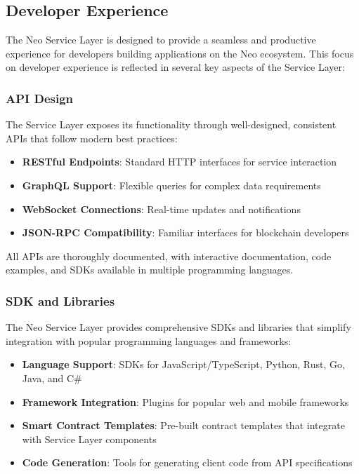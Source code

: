 \subsection{Developer Experience}
\label{subsec:nsl-developer}

The Neo Service Layer is designed to provide a seamless and productive experience for developers building applications on the Neo ecosystem. This focus on developer experience is reflected in several key aspects of the Service Layer:

\subsubsection{API Design}
\label{subsubsec:api-design}

The Service Layer exposes its functionality through well-designed, consistent APIs that follow modern best practices:

\begin{itemize}
    \item \textbf{RESTful Endpoints}: Standard HTTP interfaces for service interaction
    \item \textbf{GraphQL Support}: Flexible queries for complex data requirements
    \item \textbf{WebSocket Connections}: Real-time updates and notifications
    \item \textbf{JSON-RPC Compatibility}: Familiar interfaces for blockchain developers
\end{itemize}

All APIs are thoroughly documented, with interactive documentation, code examples, and SDKs available in multiple programming languages.

\subsubsection{SDK and Libraries}
\label{subsubsec:sdk-libraries}

The Neo Service Layer provides comprehensive SDKs and libraries that simplify integration with popular programming languages and frameworks:

\begin{itemize}
    \item \textbf{Language Support}: SDKs for JavaScript/TypeScript, Python, Rust, Go, Java, and C\#
    \item \textbf{Framework Integration}: Plugins for popular web and mobile frameworks
    \item \textbf{Smart Contract Templates}: Pre-built contract templates that integrate with Service Layer components
    \item \textbf{Code Generation}: Tools for generating client code from API specifications
\end{itemize}

